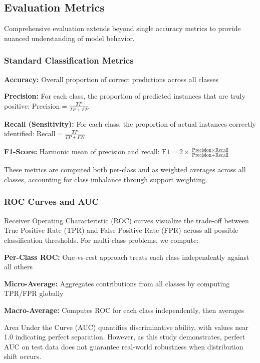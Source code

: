 \documentclass[12pt,a4paper]{article}
\begin{document}
\subsection{Evaluation Metrics}

Comprehensive evaluation extends beyond single accuracy metrics to provide nuanced understanding of model behavior.

\subsubsection{Standard Classification Metrics}

\textbf{Accuracy:} Overall proportion of correct predictions across all classes

\textbf{Precision:} For each class, the proportion of predicted instances that are truly positive: $\text{Precision} = \frac{TP}{TP + FP}$

\textbf{Recall (Sensitivity):} For each class, the proportion of actual instances correctly identified: $\text{Recall} = \frac{TP}{TP + FN}$

\textbf{F1-Score:} Harmonic mean of precision and recall: $\text{F1} = 2 \times \frac{\text{Precision} \times \text{Recall}}{\text{Precision} + \text{Recall}}$

These metrics are computed both per-class and as weighted averages across all classes, accounting for class imbalance through support weighting.

\subsubsection{ROC Curves and AUC}

Receiver Operating Characteristic (ROC) curves visualize the trade-off between True Positive Rate (TPR) and False Positive Rate (FPR) across all possible classification thresholds. For multi-class problems, we compute:

\textbf{Per-Class ROC:} One-vs-rest approach treats each class independently against all others

\textbf{Micro-Average:} Aggregates contributions from all classes by computing TPR/FPR globally

\textbf{Macro-Average:} Computes ROC for each class independently, then averages

Area Under the Curve (AUC) quantifies discriminative ability, with values near 1.0 indicating perfect separation. However, as this study demonstrates, perfect AUC on test data does not guarantee real-world robustness when distribution shift occurs.
\end{document}
